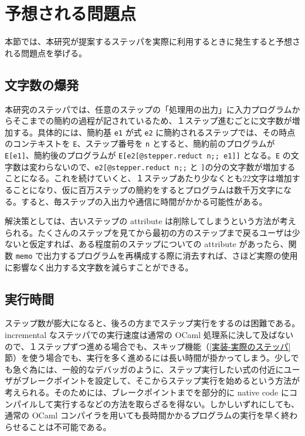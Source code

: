 \section{予想される問題点}
本節では、本研究が提案するステッパを実際に利用するときに発生すると予想される問題点を挙げる。

\subsection{文字数の爆発}
本研究のステッパでは、任意のステップの「処理用の出力」に入力プログラムからそこまでの簡約の過程が記されているため、１ステップ進むごとに文字数が増加する。具体的には、簡約基 \texttt{e1} が式 \texttt{e2} に簡約されるステップでは、その時点のコンテキストを \texttt{E}、ステップ番号を \texttt{n} とすると、簡約前のプログラムが \texttt{E[e1]}、簡約後のプログラムが \texttt{E[e2[@stepper.reduct n;; e1]]} となる。\texttt{E} の文字数は変わらないので、\texttt{e2[@stepper.reduct n;;} と \texttt{]}の分の文字数が増加することになる。これを続けていくと、１ステップあたり少なくとも22文字は増加することになり、仮に百万ステップの簡約をするとプログラムは数千万文字になる。すると、毎ステップの入出力や通信に時間がかかる可能性がある。

解決策としては、古いステップの attribute は削除してしまうという方法が考えられる。たくさんのステップを見てから最初の方のステップまで戻るユーザは少ないと仮定すれば、ある程度前のステップについての attribute があったら、関数 \texttt{memo} で出力するプログラムを再構成する際に消去すれば、さほど実際の使用に影響なく出力する文字数を減らすことができる。

\subsection{実行時間}
\label{予想される問題点-実行時間}

ステップ数が膨大になると、後ろの方までステップ実行をするのは困難である。incremental なステッパでの実行速度は通常の OCaml 処理系に決して及ばないので、１ステップずつ進める場合でも、スキップ機能（\ref{実装-実際のステッパ}節）を使う場合でも、実行を多く進めるには長い時間が掛かってしまう。少しでも急ぐ為には、一般的なデバッガのように、ステップ実行したい式の付近にユーザがブレークポイントを設定して、そこからステップ実行を始めるという方法が考えられる。そのためには、ブレークポイントまでを部分的に native code にコンパイルして実行するなどの方法を取らざるを得ない。しかしいずれにしても、通常の OCaml コンパイラを用いても長時間かかるプログラムの実行を早く終わらせることは不可能である。

